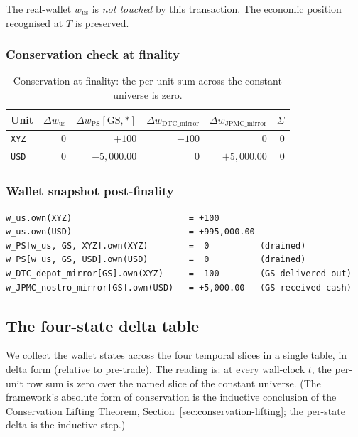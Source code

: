 \documentclass[11pt,a4paper]{article}
\begin{document}
The real-wallet $w_{\mathrm{us}}$ is \emph{not touched} by this transaction. The economic position recognised at $T$ is preserved.

\subsubsection*{Conservation check at finality}

\begin{table}[h]
\centering
\begin{tabular}{lrrrrr}
\toprule
\textbf{Unit} & $\Delta w_{\mathrm{us}}$ & $\Delta w_{\mathrm{PS}}[\mathrm{GS},*]$ & $\Delta w_{\mathrm{DTC\_mirror}}$ & $\Delta w_{\mathrm{JPMC\_mirror}}$ & $\Sigma$ \\
\midrule
\texttt{XYZ} & $0$ & $+100$        & $-100$ & $0$           & $0$ \\
\texttt{USD} & $0$ & $-5{,}000.00$ & $0$    & $+5{,}000.00$ & $0$ \\
\bottomrule
\end{tabular}
\caption{Conservation at finality: the per-unit sum across the constant universe is zero.}
\label{tab:buy-finality-conservation}
\end{table}

\subsubsection*{Wallet snapshot post-finality}

\begin{lstlisting}
w_us.own(XYZ)                       = +100
w_us.own(USD)                       = +995,000.00
w_PS[w_us, GS, XYZ].own(XYZ)        =  0          (drained)
w_PS[w_us, GS, USD].own(USD)        =  0          (drained)
w_DTC_depot_mirror[GS].own(XYZ)     = -100        (GS delivered out)
w_JPMC_nostro_mirror[GS].own(USD)   = +5,000.00   (GS received cash)
\end{lstlisting}

\subsection{The four-state delta table}
\label{sec:buy-delta-table}

We collect the wallet states across the four temporal slices in a single table, in delta form (relative to pre-trade). The reading is: at every wall-clock $t$, the per-unit row sum is zero over the named slice of the constant universe. (The framework's absolute form of conservation is the inductive conclusion of the Conservation Lifting Theorem, Section~\ref{sec:conservation-lifting}; the per-state delta is the inductive step.)
\end{document}
